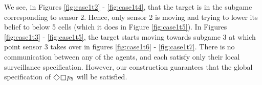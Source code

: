  We see, in Figures \ref{fig:case1t2} - \ref{fig:case1t4}, that the target is in the subgame corresponding to sensor 2. Hence, only sensor 2 is moving and trying to lower its belief to below 5 cells (which it does in Figure \ref{fig:case1t5}). In Figures \ref{fig:case1t3} - \ref{fig:case1t5}, the target starts moving towards subgame 3 at which point sensor 3 takes over in figures \ref{fig:case1t6} - \ref{fig:case1t7}. There is no communication between any of the agents, and each satisfy only their local surveillance specification. However, our construction guarantees that the global specification of $\LTLfinally \LTLglobally p_5$ will be satisfied. %
 

